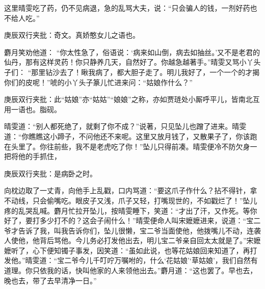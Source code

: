 \begin{parag}
    这里晴雯吃了药，仍不见病退，急的乱骂大夫，说：“只会骗人的钱，一剂好药也不给人吃。”\begin{note}庚辰双行夹批：奇文。真娇憨女儿之语也。\end{note}麝月笑劝他道： “你太性急了，俗语说：‘病来如山倒，病去如抽丝。’又不是老君的仙丹，那有这样灵药！你只静养几天，自然好了。你越急越著手。”晴雯又骂小丫头子们： “那里钻沙去了！瞅我病了，都大胆子走了。明儿我好了，一个一个的才揭你们的皮呢！”唬的小丫头子篆儿忙进来问：“姑娘作什么？”\begin{note}庚辰双行夹批：此“姑娘”亦“姑姑”“娘娘”之称，亦如贾琏处小厮呼平儿，皆南北互用一语也。脂砚。\end{note}晴雯道：“别人都死绝了，就剩了你不成？”说著，只见坠儿也蹭了进来。晴雯道：“你瞧瞧这小蹄子，不问他还不来呢。这里又放月钱了，又散果子了，你该跑在头里了。你往前些，我不是老虎吃了你！”坠儿只得前凑。晴雯便冷不防欠身一把将他的手抓住，\begin{note}庚辰双行夹批：是病卧之时。\end{note}向枕边取了一丈青，向他手上乱戳，口内骂道：“要这爪子作什么？拈不得针，拿不动线，只会偷嘴吃。眼皮子又浅，爪子又轻，打嘴现世的，不如戳烂了！”坠儿疼的乱哭乱喊。麝月忙拉开坠儿，按晴雯睡下，笑道：“才出了汗，又作死。等你好了，要打多少打不的？这会子闹什么！”晴雯便命人叫宋嬷嬷进来，说道：“宝二爷才告诉了我，叫我告诉你们，坠儿很懒，宝二爷当面使他，他拨嘴儿不动，连袭人使他，他背后骂他。今儿务必打发他出去，明儿宝二爷亲自回太太就是了。”宋嬷嬷听了，心下便知镯子事发，因笑道：“虽如此说，也等花姑娘回来知道了，再打发他。”晴雯道：“宝二爷今儿千叮咛万嘱咐的，什么‘花姑娘’‘草姑娘’，我们自然有道理。你只依我的话，快叫他家的人来领他出去。”麝月道：“这也罢了。早也去，晚也去，带了去早清净一日。”
\end{parag}


